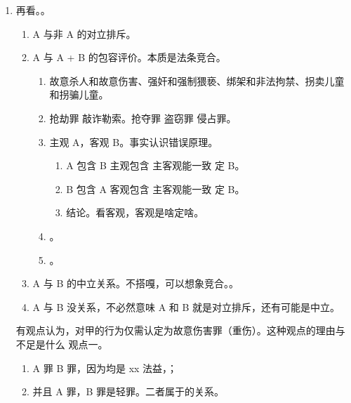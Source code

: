 \begin{enumerate}
\begin{enumerate}
\begin{enumerate}
                \end{enumerate}
        \end{enumerate}
  \item 再看。。
        \begin{enumerate}
          \item A 与非 A 的对立排斥。
          \item A 与 A + B 的包容评价。本质是法条竞合。
                \begin{enumerate}
                  \item 故意杀人和故意伤害、强奸和强制猥亵、绑架和非法拘禁、拐卖儿童和拐骗儿童。
                  \item 抢劫罪 \yjt \yi 敲诈勒索。\er 抢夺罪 \yjt 盗窃罪 \yjt 侵占罪。
                  \item 主观 A，客观 B。事实认识错误原理。
                        \begin{enumerate}
                          \item A 包含 B \yjt 主观包含 \yjt 主客观能一致 \yjt 定 B。
                          \item B 包含 A \yjt 客观包含 \yjt 主客观能一致 \yjt 定 B。
                          \item 结论。看客观，客观是啥定啥。
                        \end{enumerate}
                  \item {}。
                  \item {}。
                \end{enumerate}
          \item A 与 B 的中立关系。不搭嘎，可以想象竞合。。
          \item A 与 B 没关系，不必然意味 A 和 B 就是对立排斥，还有可能是中立。
        \end{enumerate}
        \begin{kk}{有观点认为，对甲的行为仅需认定为故意伤害罪（重伤）。这种观点的理由与不足是什么}
          观点一。
          \begin{enumerate}
            \item A 罪 B 罪，因为均是 xx 法益，；
            \item 并且 A 罪，B 罪是轻罪。二者属于的关系。

\end{enumerate}
\end{kk}
\end{enumerate}
